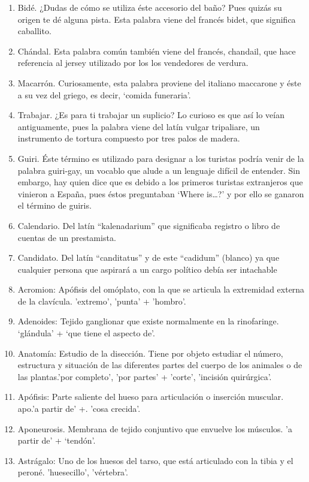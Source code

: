 \documentclass{mylib/reporte}
\begin{document}
\begin{enumerate}
	\item Bidé. ¿Dudas de cómo se utiliza éste accesorio del baño? Pues quizás su origen te dé alguna pista. Esta palabra viene del francés bidet, que significa caballito.
	\item Chándal. Esta palabra común también viene del francés, chandail, que hace referencia al jersey utilizado por los los vendedores de verdura.
	\item Macarrón. Curiosamente, esta palabra proviene del italiano maccarone y éste a su vez del griego, es decir, ‘comida funeraria’.
	\item Trabajar. ¿Es para ti trabajar un suplicio? Lo curioso es que así lo veían antiguamente, pues la palabra viene del latín vulgar tripaliare, un instrumento de tortura compuesto por tres palos de madera.
	\item Guiri. Éste término es utilizado para designar a los turistas podría venir de la palabra guiri-gay, un vocablo que alude a un lenguaje difícil de entender. Sin embargo, hay quien dice que es debido a los primeros turistas extranjeros que vinieron a España, pues éstos preguntaban ‘Where is…?’ y por ello se ganaron el término de guiris.
	\item Calendario. Del latín “kalenadarium” que significaba registro o libro de cuentas de un prestamista.
	\item Candidato. Del latín “canditatus” y de este “cadidum” (blanco) ya que cualquier persona que aspirará a un cargo político debía ser intachable
	\item Acromion: Apófisis del omóplato, con la que se articula la extremidad externa de la clavícula. 'extremo', 'punta' + 'hombro'.
	\item Adenoides: Tejido ganglionar que existe normalmente en la rinofaringe. ‘glándula’ + ‘que tiene el aspecto de’.
	\item Anatomía: Estudio de la disección. Tiene por objeto estudiar el número, estructura y situación de las diferentes partes del cuerpo de los animales o de las plantas.'por completo', 'por partes' + 'corte', 'incisión quirúrgica'.
	\item Apófisis: Parte saliente del hueso para articulación o inserción muscular. apo.'a partir de' +. 'cosa crecida'.
	\item Aponeurosis. Membrana de tejido conjuntivo que envuelve los músculos. 'a partir de' + ‘tendón’.
	\item Astrágalo: Uno de los huesos del tarso, que está articulado con la tibia y el peroné.  'huesecillo', 'vértebra'.

\end{enumerate}
\end{document}

